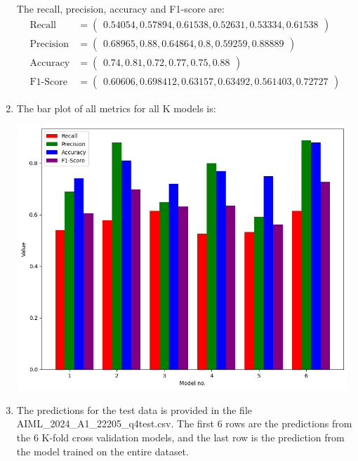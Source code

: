 \documentclass[12pt]{article}
\begin{document}
\begin{enumerate}[leftmargin=*]
    The recall, precision, accuracy and F1-score are:
    \begin{align*}
        \text{Recall} &= \begin{pmatrix} 0.54054, 0.57894, 0.61538, 0.52631, 0.53334, 0.61538 \end{pmatrix} \\
        \text{Precision} &= \begin{pmatrix} 0.68965, 0.88, 0.64864, 0.8, 0.59259, 0.88889 \end{pmatrix} \\
        \text{Accuracy} &= \begin{pmatrix} 0.74, 0.81, 0.72, 0.77, 0.75, 0.88 \end{pmatrix} \\
        \text{F1-Score} &= \begin{pmatrix} 0.60606, 0.698412, 0.63157, 0.63492, 0.561403, 0.72727 \end{pmatrix}
    \end{align*}

    \item The bar plot of all metrics for all K models is:
    \begin{center}
        \includegraphics[height=10cm, width=12.5cm]{img/barplot.png}
    \end{center}

    \item The predictions for the test data is provided in the file AIML\_2024\_A1\_22205\_q4test.csv. The first 6 rows are the predictions from the 6 K-fold cross validation models, and the last row is the prediction from the model trained on the entire dataset.
\end{enumerate}
\end{document}
